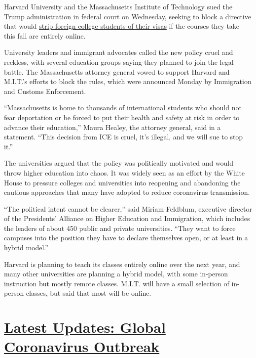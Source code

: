 Harvard University and the Massachusetts Institute of Technology sued
the Trump administration in federal court on Wednesday, seeking to block
a directive that would
\href{https://www.nytimes.com/2020/07/09/world/international-students-visa-reaction.html}{strip
foreign college students of their visas} if the courses they take this
fall are entirely online.

University leaders and immigrant advocates called the new policy cruel
and reckless, with several education groups saying they planned to join
the legal battle. The Massachusetts attorney general vowed to support
Harvard and M.I.T.'s efforts to block the rules, which were announced
Monday by Immigration and Customs Enforcement.

``Massachusetts is home to thousands of international students who
should not fear deportation or be forced to put their health and safety
at risk in order to advance their education,'' Maura Healey, the
attorney general, said in a statement. ``This decision from ICE is
cruel, it's illegal, and we will sue to stop it.''

The universities argued that the policy was politically motivated and
would throw higher education into chaos. It was widely seen as an effort
by the White House to pressure colleges and universities into reopening
and abandoning the cautious approaches that many have adopted to reduce
coronavirus transmission.

``The political intent cannot be clearer,'' said Miriam Feldblum,
executive director of the Presidents' Alliance on Higher Education and
Immigration, which includes the leaders of about 450 public and private
universities. ``They want to force campuses into the position they have
to declare themselves open, or at least in a hybrid model.''

Harvard is planning to teach its classes entirely online over the next
year, and many other universities are planning a hybrid model, with some
in-person instruction but mostly remote classes. M.I.T. will have a
small selection of in-person classes, but said that most will be online.

\hypertarget{latest-updates-global-coronavirus-outbreak}{%
\section{\texorpdfstring{\href{https://www.nytimes.com/2020/08/01/world/coronavirus-covid-19.html?action=click\&pgtype=Article\&state=default\&region=MAIN_CONTENT_1\&context=storylines_live_updates}{Latest
Updates: Global Coronavirus
Outbreak}}{Latest Updates: Global Coronavirus Outbreak}}\label{latest-updates-global-coronavirus-outbreak}}

